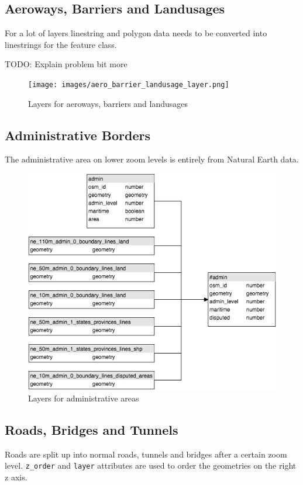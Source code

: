 \newpage
\subsection{Aeroways, Barriers and Landusages}

For a lot of layers linestring and polygon data needs to be converted into
linestrings for the feature class.

TODO: Explain problem bit more

\begin{figure}[H]
  \centering
  \texttt{[image: images/aero\_barrier\_landusage\_layer.png]}
  \caption{Layers for aeroways, barriers and landusages}
\end{figure}

\newpage
\subsection{Administrative Borders}
The administrative area on lower zoom levels is entirely from Natural Earth data.

\begin{figure}[H]
  \centering
  \includegraphics[scale=0.6]{images/admin_layer.png}
  \caption{Layers for administrative areas}
\end{figure}

\newpage
\subsection{Roads, Bridges and Tunnels}
Roads are split up into normal roads, tunnels and bridges after a certain zoom level. \texttt{z\_order} and \texttt{layer} attributes are used to order the geometries on the right z axis.

